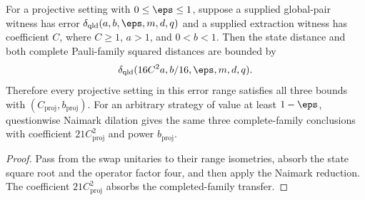 \begin{theorem}
\label{thm:qld-isometry-baselines-explicit}
\leanok
{}
For a projective setting with $0\leq\eps\leq1$, suppose a supplied global-pair
witness has error $\delta_{\mathrm{qld}}(a,b,\eps,m,d,q)$ and a supplied
extraction witness has coefficient $C$, where $C\geq1$, $a>1$, and
$0<b<1$.  Then the state distance and both complete Pauli-family squared
distances are bounded by
\[
 \delta_{\mathrm{qld}}(16C^2a,b/16,\eps,m,d,q).
\]
Therefore every projective setting in this error range satisfies all three
bounds with $(C_{\mathrm{proj}},b_{\mathrm{proj}})$.  For an arbitrary
strategy of value at least $1-\eps$, questionwise Naimark dilation gives the
same three complete-family conclusions with coefficient
$21C_{\mathrm{proj}}^2$ and power $b_{\mathrm{proj}}$.
\end{theorem}
\begin{proof}
\leanok
Pass from the swap unitaries to their range isometries, absorb the state square
root and the operator factor four, and then apply the Naimark reduction.  The
coefficient $21C_{\mathrm{proj}}^2$ absorbs the completed-family transfer.
\end{proof}

